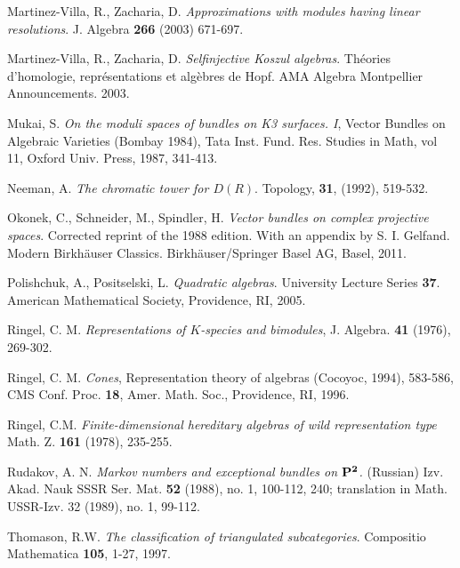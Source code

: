 \documentclass[10pt]{amsart}
\begin{document}
\begin{thebibliography}{99}
 Martinez-Villa, R., Zacharia, D. {\it
Approximations with modules having linear resolutions}. J. Algebra
{\bf 266} (2003) 671-697.

 Martinez-Villa, R., Zacharia, D. {\it
Selfinjective Koszul algebras}. Th\'eories d'homologie, repr\'esentations et alg\`ebres de Hopf. AMA Algebra Montpellier Announcements. 2003. 


 Mukai, S. {\it On the moduli spaces of bundles on K3 surfaces. I}, Vector Bundles on Algebraic Varieties (Bombay 1984), Tata Inst. Fund. Res. Studies in Math, vol 11, Oxford Univ. Press, 1987, 341-413.

 Neeman, A. {\em The chromatic tower for $D(R)$}. Topology, {\bf 31}, (1992), 519-532.

  Okonek, C., Schneider, M., Spindler, H. {\it Vector bundles on complex projective spaces}. Corrected reprint of the 1988 edition. With an appendix by S. I. Gelfand. Modern Birkh\"auser Classics. Birkh\"auser/Springer Basel AG, Basel, 2011.


  Polishchuk, A., Positselski, L. {\it Quadratic algebras}. University Lecture Series {\bf37}. American Mathematical Society, Providence, RI, 2005.

 Ringel, C. M. {\it Representations of $K$-species and bimodules}, 
J. Algebra.  {\bf 41}  (1976), 269-302.

 Ringel, C. M. {\it Cones}, Representation theory of
algebras (Cocoyoc, 1994), 583-586, CMS Conf. Proc. {\bf 18}, Amer.
Math. Soc., Providence, RI, 1996. 

 Ringel, C.M. {\it Finite-dimensional hereditary algebras of wild representation type}
Math. Z. {\bf 161} (1978), 235-255.

  Rudakov, A. N. {\it Markov numbers and exceptional bundles on $\bf P^2$.} (Russian) Izv. Akad. Nauk SSSR Ser. Mat. {\bf 52} (1988), no. 1, 100-112, 240; translation in Math. USSR-Izv. 32 (1989), no. 1, 99-112.

 Thomason, R.W. {\it The classification of triangulated subcategories}. Compositio Mathematica {\bf 105}, 1-27, 1997.

 
\end{thebibliography}
\end{document}
